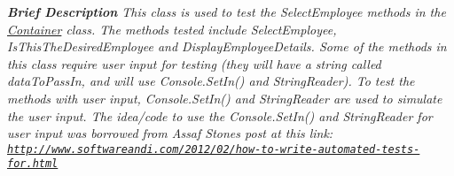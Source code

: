 \begin{DoxyCompactItemize}
\begin{DoxyCompactList}\small\item\em {\bfseries  Brief Description} This class is used to test the Select\+Employee methods in the \hyperlink{class_the_company_1_1_container}{Container} class. The methods tested include Select\+Employee, Is\+This\+The\+Desired\+Employee and Display\+Employee\+Details. Some of the methods in this class require user input for testing (they will have a string called data\+To\+Pass\+In, and will use Console.\+Set\+In() and String\+Reader). To test the methods with user input, Console.\+Set\+In() and String\+Reader are used to simulate the user input. The idea/code to use the Console.\+Set\+In() and String\+Reader for user input was borrowed from Assaf Stone\textquotesingle{}s post at this link\+: \href{http://www.softwareandi.com/2012/02/how-to-write-automated-tests-for.html}{\tt http\+://www.\+softwareandi.\+com/2012/02/how-\/to-\/write-\/automated-\/tests-\/for.\+html} \end{DoxyCompactList}\end{DoxyCompactItemize}
